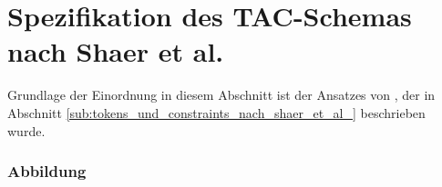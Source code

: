 
\section{Spezifikation des TAC-Schemas nach Shaer et al.} %
\label{sec:spezifikation_des_tac_schemas_nach_shaer_et_al_}

Grundlage der Einordnung in diesem Abschnitt ist der Ansatzes von \citet{Shaer04}, der in Abschnitt \ref{sub:tokens_und_constraints_nach_shaer_et_al_} beschrieben wurde.

\subsubsection{Abbildung}


